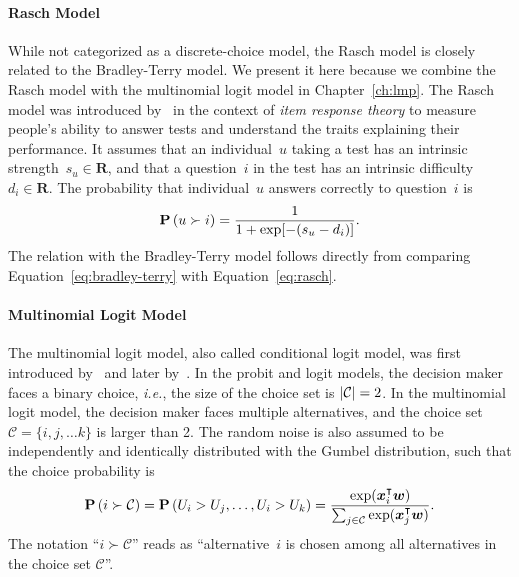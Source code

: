 \paragraph{Rasch Model}
While not categorized as a discrete-choice model, the Rasch model is closely related to the Bradley-Terry model.
We present it here because we combine the Rasch model with the multinomial logit model in Chapter~\ref{ch:lmp}.
The Rasch model was introduced by~\citet{rasch1993probabilistic} in the context of \emph{item response theory} to measure people's ability to answer tests and understand the traits explaining their performance.
It assumes that an individual~$u$ taking a test has an intrinsic strength~$s_u \in \mathbf{R}$, and that a question~$i$ in the test has an intrinsic difficulty~$d_i \in \mathbf{R}$.
The probability that individual~$u$ answers correctly to question~$i$ is
\begin{equation}
  \label{eq:rasch}
  \mathbf{P}\left( u \succ i \right) = \frac{1}{1 + \exp[-(s_u - d_i)]}.
\end{equation}
The relation with the Bradley-Terry model follows directly from comparing Equation~\ref{eq:bradley-terry} with Equation~\ref{eq:rasch}.

\paragraph{Multinomial Logit Model}

The multinomial logit model, also called conditional logit model, was first introduced by~\citet{luce1959individual} and later by~\citet{mcfadden1973conditional}.
In the probit and logit models, the decision maker faces a binary choice, \textit{i.e.}, the size of the choice set is $\lvert\mathcal{C}\rvert = 2$.
In the multinomial logit model, the decision maker faces multiple alternatives, and the choice set $\mathcal{C} = \{ i, j, \ldots k \}$ is larger than 2.
The random noise is also assumed to be independently and identically distributed with the Gumbel distribution, such that the choice probability is
\begin{equation}
  \label{eq:multinomiallogit}
  \mathbf{P}\left( i \succ \mathcal{C} \right) = \mathbf{P}\left( U_i > U_j, \ldots, U_i > U_k \right) = \frac{\exp(\bm{x}_i^\intercal \bm{w})}{\sum_{j \in \mathcal{C}} \exp(\bm{x}_j^\intercal \bm{w})}.
\end{equation}
The notation ``$i \succ \mathcal{C}$'' reads as ``alternative~$i$ is chosen among all alternatives in the choice set $\mathcal{C}$''.


